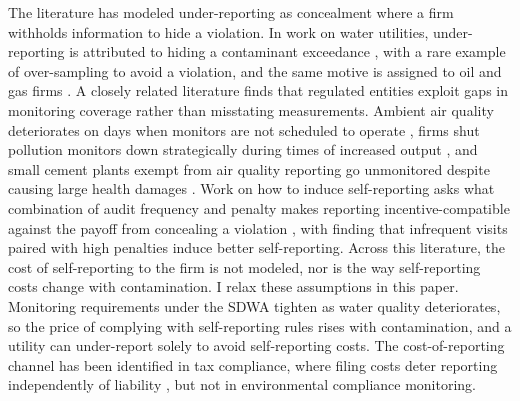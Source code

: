 \documentclass[12pt]{article}
\begin{document}
The literature has modeled under-reporting as concealment where a firm withholds information to hide a violation. In work on water utilities, under-reporting is attributed to hiding a contaminant exceedance \parencite{naylor5537637strategic, andarge2025quantifying, wallsten2008effects}, with \textcite{bennear2009sampling} a rare example of over-sampling to avoid a violation, and the same motive is assigned to oil and gas firms \parencite{lee2020essays}. A closely related literature finds that regulated entities exploit gaps in monitoring coverage rather than misstating measurements. Ambient air quality deteriorates on days when monitors are not scheduled to operate \parencite{zou2021unwatched}, firms shut pollution monitors down strategically during times of increased output \parencite{10.1162/rest_a_01477}, and small cement plants exempt from air quality reporting go unmonitored despite causing large health damages \parencite{zirogiannis2023polluting}. Work on how to induce self-reporting asks what combination of audit frequency and penalty makes reporting incentive-compatible against the payoff from concealing a violation \parencite{innes1999remediation, foster2013informational, anton2004incentives}, with \textcite{malik1993self} finding that infrequent visits paired with high penalties induce better self-reporting. Across this literature, the cost of self-reporting to the firm is not modeled, nor is the way self-reporting costs change with contamination. I relax these assumptions in this paper. Monitoring requirements under the SDWA tighten as water quality deteriorates, so the price of complying with self-reporting rules rises with contamination, and a utility can under-report solely to avoid self-reporting costs. The cost-of-reporting channel has been identified in tax compliance, where filing costs deter reporting independently of liability \parencite{tazhitdinova2018reducing}, but not in environmental compliance monitoring.
\end{document}

